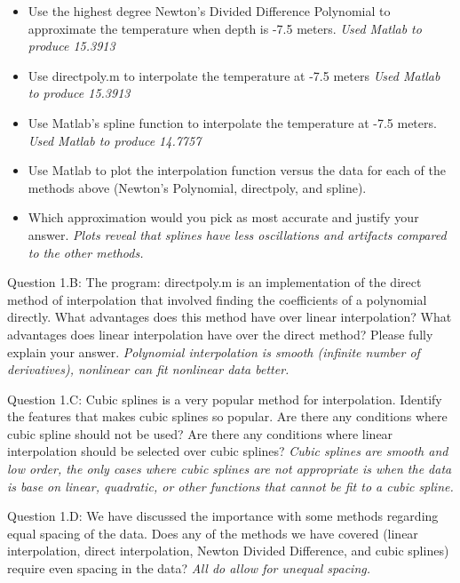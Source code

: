 \documentclass{article}
\begin{document}
\begin{itemize}
\item Use the highest degree Newton's Divided Difference Polynomial to approximate the temperature when depth is  -7.5 meters.  {\it \color{teal} Used Matlab to produce 15.3913}
\item Use directpoly.m to interpolate the temperature at -7.5 meters   {\it \color{teal} Used Matlab to produce 15.3913}
\item Use Matlab's spline function to interpolate the temperature at -7.5 meters.  {\it \color{teal} Used Matlab to produce 14.7757}
\item Use Matlab to plot the interpolation function versus the data for each of the methods above (Newton's Polynomial, directpoly, and spline). 
\item Which approximation would you pick as most accurate and justify your answer.   {\it \color{teal} Plots reveal that splines have less oscillations and artifacts compared to the other methods.}
\end{itemize}
\medskip \par \noindent
%
Question 1.B: The program: directpoly.m is an implementation of the direct method of interpolation that involved finding the coefficients of a polynomial directly. What advantages does this method have over linear interpolation? What advantages does linear interpolation have over the direct method? Please fully explain your answer.  {\it \color{teal} Polynomial interpolation is smooth (infinite number of derivatives), nonlinear can fit nonlinear data better.}
\medskip \par \noindent
%
Question 1.C: Cubic splines is a very popular method for interpolation. Identify the features that makes cubic splines so popular. Are there any conditions where cubic spline should not be used? Are there any conditions where linear interpolation should be selected over cubic splines? {\it \color{teal} Cubic splines are smooth and low order, the only cases where cubic splines are not appropriate is when the data is base on linear, quadratic, or other functions that cannot be fit to a cubic spline. }
\medskip \par \noindent
%
Question 1.D: We have discussed the importance with some methods regarding equal spacing of the data. Does any of the methods we have covered (linear interpolation, direct interpolation, Newton Divided Difference, and cubic splines) require even spacing in the data? {\it \color{teal} All do allow for unequal spacing.}
\medskip \par \noindent
\end{document}
